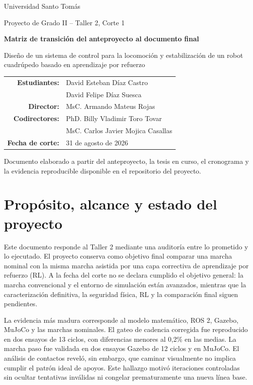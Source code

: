 \documentclass[11pt,letterpaper]{article}
\begin{document}
\begin{titlepage}
\centering
{\Large Universidad Santo Tomás\par}
\vspace{0.5cm}
{\large Proyecto de Grado II -- Taller 2, Corte 1\par}
\vfill
{\Huge\bfseries Matriz de transición del anteproyecto al documento final\par}
\vspace{0.8cm}
{\Large Diseño de un sistema de control para la locomoción y estabilización de un robot cuadrúpedo basado en aprendizaje por refuerzo\par}
\vfill
\begin{tabular}{rl}
\textbf{Estudiantes:} & David Esteban Díaz Castro\\
& David Felipe Díaz Suesca\\[2mm]
\textbf{Director:} & MsC. Armando Mateus Rojas\\
\textbf{Codirectores:} & PhD. Billy Vladimir Toro Tovar\\
& MsC. Carlos Javier Mojica Casallas\\[2mm]
\textbf{Fecha de corte:} & 31 de agosto de 2026
\end{tabular}
\vfill
{\small Documento elaborado a partir del anteproyecto, la tesis en curso, el cronograma y la evidencia reproducible disponible en el repositorio del proyecto.}
\end{titlepage}

\tableofcontents
\newpage

\section{Propósito, alcance y estado del proyecto}

Este documento responde al Taller 2 mediante una auditoría entre lo prometido y
lo ejecutado. El proyecto conserva como objetivo final comparar una marcha
nominal con la misma marcha asistida por una capa correctiva de aprendizaje por
refuerzo (RL). A la fecha del corte no se declara cumplido el objetivo general:
la marcha convencional y el entorno de simulación están avanzados, mientras que
la caracterización definitiva, la seguridad física, RL y la comparación final
siguen pendientes.

La evidencia más madura corresponde al modelo matemático, ROS 2, Gazebo,
MuJoCo y las marchas nominales. El gateo de cadencia corregida fue reproducido
en dos ensayos de 13 ciclos, con diferencias menores al 0,2\% en las medias. La
marcha paso fue validada en dos ensayos Gazebo de 12 ciclos y en MuJoCo. El
análisis de contactos reveló, sin embargo, que caminar visualmente no implica
cumplir el patrón ideal de apoyos. Este hallazgo motivó iteraciones controladas
sin ocultar tentativas inválidas ni congelar prematuramente una nueva línea
base.
\end{document}
